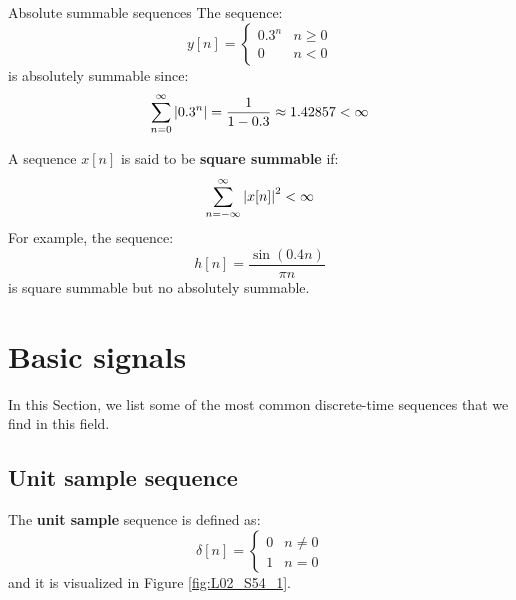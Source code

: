 \documentclass[../../main/main.tex]{subfiles}
\begin{document}
\begin{example}{Absolute summable sequences}{}
    The sequence:
    \begin{equation}
        y[n]
        =
        \begin{cases}
            0.3^{n} &   n \ge 0 \\
            0       &   n < 0
        \end{cases}
        \label{eq:L02_S52_2}
    \end{equation}
    is absolutely summable since:
    \begin{equation}
        \sum_{n=0}^{\infty} \abs{0.3^{n}}
        =
        \frac{1}{1-0.3}
        \approx
        1.42857
        < \infty
        \label{eq:L02_S52_3}
    \end{equation}
\end{example}

\medskip
{}
A sequence \( x[n] \) is said to be \textbf{square summable} if:
\begin{equation}
    \sum_{n=-\infty}^{\infty} \abs{x[n]}^{2}
    <
    \infty
    \label{eq:L02_S53_1}
\end{equation}
For example, the sequence:
\begin{equation}
    h[n]
    =
    \frac{\sin(0.4n)}{\pi n}
    \label{eq:L02_S53_2}
\end{equation}
is square summable but no absolutely summable.





\section{Basic signals}
In this Section, we list some of the most common discrete-time sequences that we find in this field.



\subsection{Unit sample sequence}
The \textbf{unit sample} sequence is defined as:
\begin{equation}
    \delta[n]
    =
    \begin{cases}
        0   &   n \neq 0    \\
        1   &   n = 0
    \end{cases}
    \label{eq:L02_S54_1}
\end{equation}
and it is visualized in Figure \ref{fig:L02_S54_1}.
\end{document}
